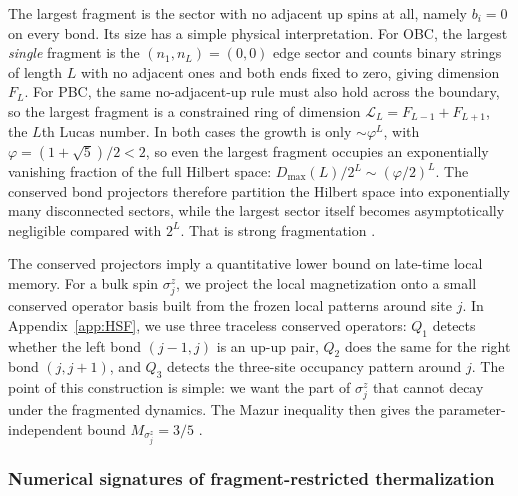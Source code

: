 \documentclass[aps,prb,reprint,twocolumn,amsmath,amssymb,citeautoscript]{revtex4-2}
\begin{document}
The largest fragment is the sector with no adjacent up spins at all, namely $b_i=0$ on every bond. Its size has a simple physical interpretation. For OBC, the largest \textit{single} fragment is the $(n_1,n_L)=(0,0)$ edge sector and counts binary strings of length $L$ with no adjacent ones and both ends fixed to zero, giving dimension $F_L$. For PBC, the same no-adjacent-up rule must also hold across the boundary, so the largest fragment is a constrained ring of dimension $\mathcal{L}_L=F_{L-1}+F_{L+1}$, the $L$th Lucas number. In both cases the growth is only $\sim \varphi^L$, with $\varphi=(1+\sqrt5)/2<2$, so even the largest fragment occupies an exponentially vanishing fraction of the full Hilbert space: $D_{\max}(L)/2^L\sim (\varphi/2)^L$. The conserved bond projectors therefore partition the Hilbert space into exponentially many disconnected sectors, while the largest sector itself becomes asymptotically negligible compared with $2^L$. That is strong fragmentation \cite{Sala2020PRX,Khemani2020PRBShattering,Rakovszky2020PRBEdgeModes,MoudgalyaBernevigRegnault2022RPP}.

The conserved projectors imply a quantitative lower bound on late-time local memory. For a bulk spin $\sigma_j^z$, we project the local magnetization onto a small conserved operator basis built from the frozen local patterns around site $j$. In Appendix~\ref{app:HSF}, we use three traceless conserved operators: $Q_1$ detects whether the left bond $(j-1,j)$ is an up-up pair, $Q_2$ does the same for the right bond $(j,j+1)$, and $Q_3$ detects the three-site occupancy pattern around $j$. The point of this construction is simple: we want the part of $\sigma_j^z$ that cannot decay under the fragmented dynamics. The Mazur inequality then gives the parameter-independent bound $M_{\sigma_j^z}=3/5$ \cite{Mazur1969Physica,Sirker2020SciPost}.

\subsubsection{Numerical signatures of fragment-restricted thermalization}
\end{document}
